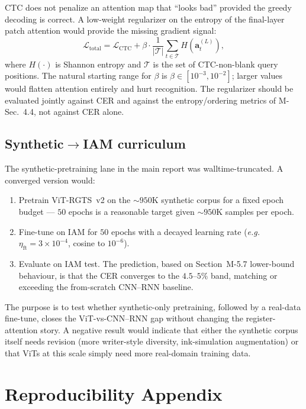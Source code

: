 \documentclass[11pt,a4paper]{article}
\newcommand{\eg}{\textit{e.g.}}
\begin{document}
CTC does not penalize an attention map that ``looks bad'' provided the greedy decoding is correct. A low-weight regularizer on the entropy of the final-layer patch attention would provide the missing gradient signal:
\begin{equation}
\label{eq:aux_entropy}
\mathcal{L}_{\mathrm{total}} = \mathcal{L}_{\mathrm{CTC}} + \beta \cdot \frac{1}{|\mathcal{T}|} \sum_{t \in \mathcal{T}} H(\mathbf{a}_t^{(L)}),
\end{equation}
where $H(\cdot)$ is Shannon entropy and $\mathcal{T}$ is the set of CTC-non-blank query positions. The natural starting range for $\beta$ is $\beta \in [10^{-3}, 10^{-2}]$; larger values would flatten attention entirely and hurt recognition. The regularizer should be evaluated jointly against CER and against the entropy/ordering metrics of M-Sec.~4.4, not against CER alone.

\subsection{Synthetic$\to$IAM curriculum}

The synthetic-pretraining lane in the main report was walltime-truncated. A converged version would:

\begin{enumerate}
    \item Pretrain ViT-RGTS~v2 on the ${\sim}950$K synthetic corpus for a fixed epoch budget --- $50$ epochs is a reasonable target given ${\sim}950$K samples per epoch.
    \item Fine-tune on IAM for $50$ epochs with a decayed learning rate (\eg\ $\eta_{\mathrm{ft}} = 3 \times 10^{-4}$, cosine to $10^{-6}$).
    \item Evaluate on IAM test. The prediction, based on Section~M-5.7 lower-bound behaviour, is that the CER converges to the $4.5$--$5\%$ band, matching or exceeding the from-scratch CNN--RNN baseline.
\end{enumerate}

The purpose is to test whether synthetic-only pretraining, followed by a real-data fine-tune, closes the ViT-vs-CNN--RNN gap without changing the register-attention story. A negative result would indicate that either the synthetic corpus itself needs revision (more writer-style diversity, ink-simulation augmentation) or that ViTs at this scale simply need more real-domain training data.

\section{Reproducibility Appendix}
\label{supp:repro}
\end{document}
